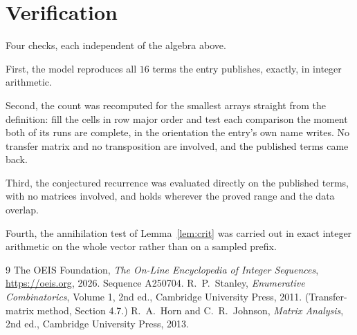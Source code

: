 \documentclass[11pt,a4paper]{article}
\theoremstyle{plain}
\theoremstyle{definition}
\begin{document}
\section{Verification}

Four checks, each independent of the algebra above.

First, the model reproduces all $16$ terms the entry publishes, exactly, in integer
arithmetic.

Second, the count was recomputed for the smallest arrays straight from the definition: fill the
cells in row major order and test each comparison the moment both of its runs are complete,
in the orientation the entry's own name writes. No transfer matrix and no transposition are
involved, and the published terms came back.

Third, the conjectured recurrence was evaluated directly on the published terms, with no
matrices involved, and holds wherever the proved range and the data overlap.

Fourth, the annihilation test of Lemma~\ref{lem:crit} was carried out in exact integer
arithmetic on the whole vector rather than on a sampled prefix.

\begin{thebibliography}{9}
 The OEIS Foundation, \emph{The On-Line Encyclopedia of Integer
Sequences}, \url{https://oeis.org}, 2026. Sequence A250704.
 R.~P.~Stanley, \emph{Enumerative Combinatorics}, Volume 1, 2nd ed.,
Cambridge University Press, 2011. (Transfer-matrix method, Section 4.7.)
 R.~A.~Horn and C.~R.~Johnson, \emph{Matrix Analysis}, 2nd ed., Cambridge
University Press, 2013.
\end{thebibliography}
\end{document}
